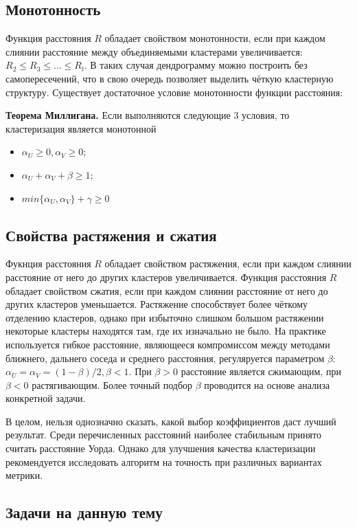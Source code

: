 \subsection*{Монотонность}

Функция расстояния $R$ обладает свойством монотонности, если при каждом слиянии расстояние между объединяемыми кластерами увеличивается: $R_2 \leq R_3 \leq...\leq R_l$. В таких случая дендрограмму можно построить без самопересечений, что в свою очередь позволяет выделить чёткую кластерную структуру. Существует достаточное условие монотонности функции расстояния:

\textbf{Теорема Миллигана.} Если выполняются следующие 3 условия, то кластеризация является монотонной
\begin{itemize}
    \item $\alpha_U \geq 0, \alpha_V \geq 0$;
    \item $\alpha_U + \alpha_V + \beta \geq 1;$
    \item $min \{{\alpha_U, \alpha_V}\} + \gamma \geq 0$
\end{itemize}

\subsection{Свойства растяжения и сжатия}

Фукнция расстояния $R$ обладает свойством растяжения, если при каждом слиянии расстояние от него до других кластеров увеличивается. Функция расстояния $R$ обладает свойством сжатия, если при каждом слиянии расстояние от него до других кластеров уменьшается. Растяжение способствует более чёткому отделению кластеров, однако при избыточно слишком большом растяжении некоторые кластеры находятся там, где их изначально не было. На практике используется гибкое расстояние, являющееся компромиссом между методами ближнего, дальнего соседа и среднего расстояния, регуляруется параметром $\beta$: $\alpha_U = \alpha_V = (1 - \beta)/2, \beta < 1$. При $\beta > 0$ расстояние является сжимающим, при $\beta < 0$ растягивающим. Более точный подбор $\beta$ проводится на основе анализа конкретной задачи. 

В целом, нельзя однозначно сказать, какой выбор коэффициентов даст лучший результат. Среди перечисленных расстояний наиболее стабильным принято считать расстояние Уорда. Однако для улучшения качества кластеризации рекомендуется исследовать алгоритм на точность при различных вариантах метрики. 

\subsection*{Задачи на данную тему}

